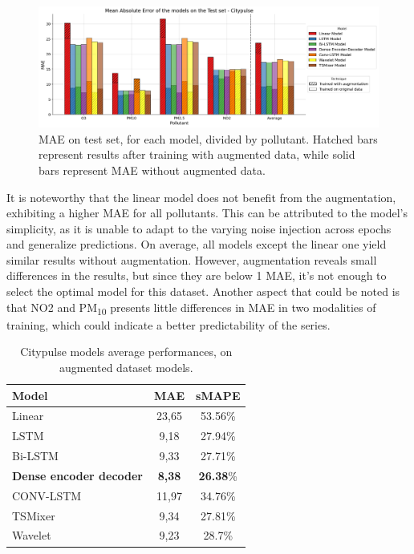 \begin{figure}[h]
    \centering
    \includegraphics[width=1\linewidth]{images/Aarhus_results.png}
    \caption{MAE on test set, for each model, divided by pollutant. Hatched bars represent results after training with augmented data, while solid bars represent MAE without augmented data.}
    \label{fig:aarhus_results}
\end{figure}

It is noteworthy that the linear model does not benefit from the augmentation, exhibiting a higher MAE for all pollutants. This can be attributed to the model's simplicity, as it is unable to adapt to the varying noise injection across epochs and generalize predictions. On average, all models except the linear one yield similar results without augmentation. However, augmentation reveals small differences in the results, but since they are below 1 MAE, it's not enough to select the optimal model for this dataset.
Another aspect that could be noted is that NO2 and PM\textsubscript{10} presents little differences in MAE in two modalities of training, which could indicate a better predictability of the series.

\begin{table}[h]
    \centering
    \begin{tabular}{lcc}
        \toprule
        \textbf{Model} & \textbf{MAE} & \textbf{sMAPE} \\ 
        \midrule
        Linear & 23,65 & 53.56\% \\
        LSTM & 9,18 & 27.94\% \\
        Bi-LSTM & 9,33 & 27.71\% \\
        \textbf{Dense encoder decoder} & \textbf{8,38} & \textbf{26.38}\% \\
        CONV-LSTM & 11,97 & 34.76\% \\
        TSMixer & 9,34 & 27.81\% \\
        Wavelet & 9,23 & 28.7\% \\ 
        \bottomrule
        \end{tabular}
        \caption{Citypulse models average performances, on augmented dataset models.}
        \label{tab:Citypulse performances}
\end{table}


